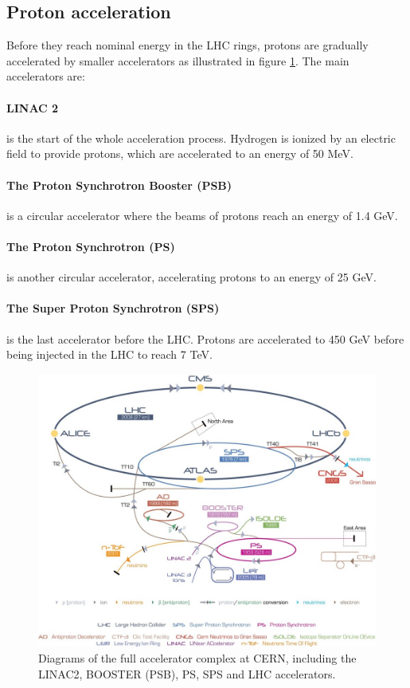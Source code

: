 \subsection{Proton acceleration}

Before they reach nominal energy in the LHC rings, protons are gradually accelerated by smaller accelerators as illustrated in figure \ref{fig:LHC_acceleration}. The main accelerators are:

\paragraph{LINAC 2} is the start of the whole acceleration process. Hydrogen is ionized by an electric field to provide protons, which are accelerated to an energy of 50 MeV.

\paragraph{The Proton Synchrotron Booster (PSB)} is a circular accelerator where the beams of protons reach an energy of 1.4 GeV.

\paragraph{The Proton Synchrotron (PS)} is another circular accelerator, accelerating protons to an energy of 25 GeV.

\paragraph{The Super Proton Synchrotron (SPS)} is the last accelerator before the LHC. Protons are accelerated to 450 GeV before being injected in the LHC to reach 7 TeV.

\begin{figure}
    \centering
    \includegraphics[width=\textwidth]{Images/CERN_accelerators.jpg}
    \caption{Diagrams of the full accelerator complex at CERN, including the LINAC2, BOOSTER (PSB), PS, SPS and LHC accelerators.}
    \label{fig:LHC_acceleration}
\end{figure}

